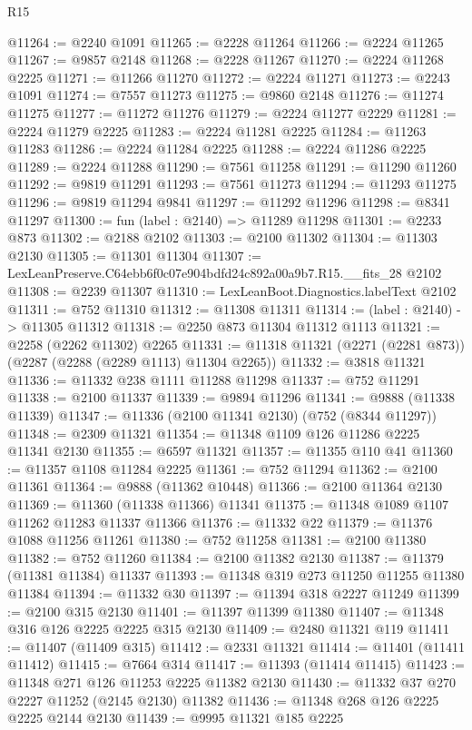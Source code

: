 \begin{lexlean}{R15}
\begin{coremodule}
@11264 := @2240 @1091
@11265 := @2228 @11264
@11266 := @2224 @11265
@11267 := @9857 @2148
@11268 := @2228 @11267
@11270 := @2224 @11268 @2225
@11271 := @11266 @11270
@11272 := @2224 @11271
@11273 := @2243 @1091
@11274 := @7557 @11273
@11275 := @9860 @2148
@11276 := @11274 @11275
@11277 := @11272 @11276
@11279 := @2224 @11277 @2229
@11281 := @2224 @11279 @2225
@11283 := @2224 @11281 @2225
@11284 := @11263 @11283
@11286 := @2224 @11284 @2225
@11288 := @2224 @11286 @2225
@11289 := @2224 @11288
@11290 := @7561 @11258
@11291 := @11290 @11260
@11292 := @9819 @11291
@11293 := @7561 @11273
@11294 := @11293 @11275
@11296 := @9819 @11294 @9841
@11297 := @11292 @11296
@11298 := @8341 @11297
@11300 := fun (label : @2140) => @11289 @11298
@11301 := @2233 @873
@11302 := @2188 @2102
@11303 := @2100 @11302
@11304 := @11303 @2130
@11305 := @11301 @11304
@11307 := LexLeanPreserve.C64ebb6f0c07e904bdfd24c892a00a9b7.R15.__fits_28 @2102
@11308 := @2239 @11307
@11310 := LexLeanBoot.Diagnostics.labelText @2102
@11311 := @752 @11310
@11312 := @11308 @11311
@11314 := (label : @2140) -> @11305 @11312
@11318 := @2250 @873 @11304 @11312 @1113
@11321 := @2258 (@2262 @11302) @2265
@11331 := @11318 @11321 (@2271 (@2281 @873)) (@2287 (@2288 (@2289 @1113) @11304 @2265))
@11332 := @3818 @11321
@11336 := @11332 @238 @1111 @11288 @11298
@11337 := @752 @11291
@11338 := @2100 @11337
@11339 := @9894 @11296
@11341 := @9888 (@11338 @11339)
@11347 := @11336 (@2100 @11341 @2130) (@752 (@8344 @11297))
@11348 := @2309 @11321
@11354 := @11348 @1109 @126 @11286 @2225 @11341 @2130
@11355 := @6597 @11321
@11357 := @11355 @110 @41
@11360 := @11357 @1108 @11284 @2225
@11361 := @752 @11294
@11362 := @2100 @11361
@11364 := @9888 (@11362 @10448)
@11366 := @2100 @11364 @2130
@11369 := @11360 (@11338 @11366) @11341
@11375 := @11348 @1089 @1107 @11262 @11283 @11337 @11366
@11376 := @11332 @22
@11379 := @11376 @1088 @11256 @11261
@11380 := @752 @11258
@11381 := @2100 @11380
@11382 := @752 @11260
@11384 := @2100 @11382 @2130
@11387 := @11379 (@11381 @11384) @11337
@11393 := @11348 @319 @273 @11250 @11255 @11380 @11384
@11394 := @11332 @30
@11397 := @11394 @318 @2227 @11249
@11399 := @2100 @315 @2130
@11401 := @11397 @11399 @11380
@11407 := @11348 @316 @126 @2225 @2225 @315 @2130
@11409 := @2480 @11321 @119
@11411 := @11407 (@11409 @315)
@11412 := @2331 @11321
@11414 := @11401 (@11411 @11412)
@11415 := @7664 @314
@11417 := @11393 (@11414 @11415)
@11423 := @11348 @271 @126 @11253 @2225 @11382 @2130
@11430 := @11332 @37 @270 @2227 @11252 (@2145 @2130) @11382
@11436 := @11348 @268 @126 @2225 @2225 @2144 @2130
@11439 := @9995 @11321 @185 @2225

\end{coremodule}
\end{lexlean}
